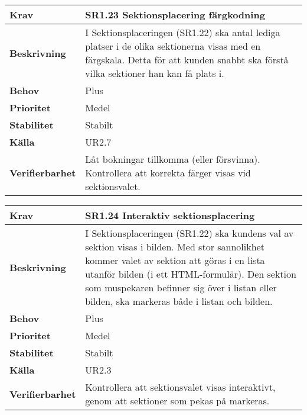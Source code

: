 \documentclass[a4paper, twoside, 11pt, titlepage]{article}
\begin{document}
		\begin {table} [ht] \begin{tabular} { p{2.6cm} p{12.5cm} }
			\hline
			\sffamily\textbf{Krav} & \sffamily\textbf{SR1.23 Sektionsplacering färgkodning } \\
			\hline
			\sffamily\textbf{Beskrivning} & I Sektionsplaceringen (SR1.22) ska antal lediga platser i de olika sektionerna visas med en färgskala. Detta för att kunden snabbt ska förstå vilka sektioner han kan få plats i.  \\
			\hline
			\sffamily\textbf{Behov} & Plus  \\
			\hline
			\sffamily\textbf{Prioritet} & Medel  \\
			\hline
			\sffamily\textbf{Stabilitet} & Stabilt  \\
			\hline
			\sffamily\textbf{Källa} & UR2.7  \\
			\hline
			\sffamily\textbf{Verifierbarhet} & Låt bokningar tillkomma (eller försvinna). Kontrollera att korrekta färger visas vid sektionsvalet.  \\
			\hline
		\end{tabular} \end{table} \FloatBarrier
		\vspace{6mm}

		\begin {table} [ht] \begin{tabular} { p{2.6cm} p{12.5cm} }
			\hline
			\sffamily\textbf{Krav} & \sffamily\textbf{SR1.24 Interaktiv sektionsplacering } \\
			\hline
			\sffamily\textbf{Beskrivning} & I Sektionsplaceringen (SR1.22) ska kundens val av sektion visas i bilden. Med stor sannolikhet kommer valet av sektion att göras i en lista utanför bilden (i ett HTML-formulär). Den sektion som muspekaren befinner sig över i listan eller bilden, ska markeras både i listan och bilden.  \\
			\hline
			\sffamily\textbf{Behov} & Plus  \\
			\hline
			\sffamily\textbf{Prioritet} & Medel  \\
			\hline
			\sffamily\textbf{Stabilitet} & Stabilt  \\
			\hline
			\sffamily\textbf{Källa} & UR2.3  \\
			\hline
			\sffamily\textbf{Verifierbarhet} & Kontrollera att sektionsvalet visas interaktivt, genom att sektioner som pekas på markeras.  \\
			\hline
		\end{tabular} \end{table} \FloatBarrier
		\vspace{6mm}
\end{document}
